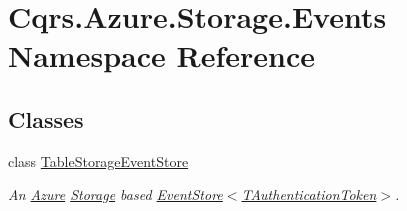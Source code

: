 \hypertarget{namespaceCqrs_1_1Azure_1_1Storage_1_1Events}{}\section{Cqrs.\+Azure.\+Storage.\+Events Namespace Reference}
\label{namespaceCqrs_1_1Azure_1_1Storage_1_1Events}
\subsection*{Classes}
\begin{DoxyCompactItemize}
\item 
class \hyperlink{classCqrs_1_1Azure_1_1Storage_1_1Events_1_1TableStorageEventStore}{Table\+Storage\+Event\+Store}
\begin{DoxyCompactList}\small\item\em An \hyperlink{namespaceCqrs_1_1Azure}{Azure} \hyperlink{namespaceCqrs_1_1Azure_1_1Storage}{Storage} based \hyperlink{classCqrs_1_1Events_1_1EventStore_a6346cb2aea4c5b4e740dc6cfb15abab8_a6346cb2aea4c5b4e740dc6cfb15abab8}{Event\+Store$<$\+T\+Authentication\+Token$>$}. \end{DoxyCompactList}\end{DoxyCompactItemize}
